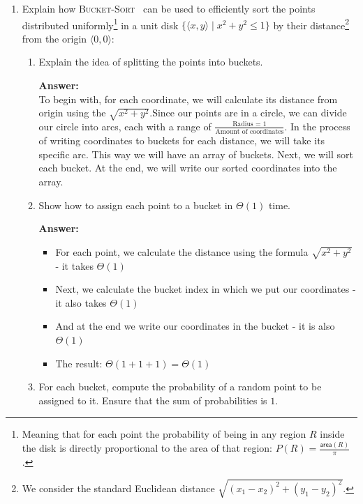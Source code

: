 \documentclass[dvipsnames]{article}
\begin{document}
\begin{enumerate}
  \item Explain how \textsc{Bucket-Sort}~\cite[\S 8.4]{Cormen2022} can be used to efficiently sort the points
    distributed uniformly\footnote{Meaning that for each point the probability of being in any region $R$
    inside the disk is directly proportional to the area of that region: $P(R) = \frac{\mathsf{area}(R)}{\pi}$.}
    in a unit disk $\{ \langle x, y \rangle \mid x^2 + y^2 \leq 1 \}$
    by their distance\footnote{We consider the standard Euclidean distance $\sqrt{(x_1 - x_2)^2 + (y_1 - y_2)^2}$.} from the origin $\langle 0, 0 \rangle$:

    \begin{enumerate}
      \item Explain the idea of splitting the points into buckets.

      \color{blue}
      \textbf{Answer:}\\
      To begin with, for each coordinate, we will calculate its distance from origin using the $\sqrt{x^2 + y^2}$.Since our points are in a circle, we can divide our circle into arcs, each with a range of $\frac{\text{Radius = 1}}{\text{Amount of coordinates}}$. In the process of writing coordinates to buckets for each distance, we will take its specific arc. This way we will have an array of buckets. Next, we will sort each bucket. At the end, we will write our sorted coordinates into the array.\\
      \color{black}

      \item Show how to assign each point to a bucket in $\Theta(1)$ time.

      \color{blue}
      \textbf{Answer:}
      \begin{itemize}
        \item For each point, we calculate the distance using the formula $\sqrt{x^2 + y^2}$ - it takes $\Theta(1)$
        \item Next, we calculate the bucket index in which we put our coordinates - it also takes $\Theta(1)$
        \item And at the end we write our coordinates in the bucket - it is also $\Theta(1)$
        \item The result: $\Theta(1+1+1 ) = \Theta(1)$
      \end{itemize}
      \color{black}

      \item For each bucket, compute the probability of a random point to be assigned to it.
            Ensure that the sum of probabilities is $1$.


\end{enumerate}
\end{enumerate}
\end{document}
